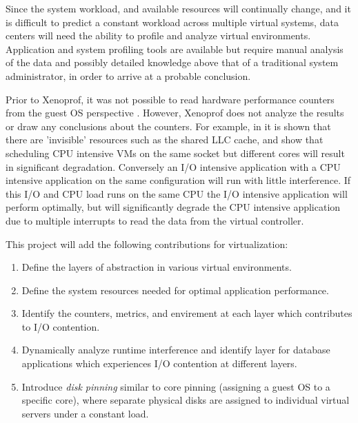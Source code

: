 Since the system workload, and available resources will continually change, and it is difficult to predict a constant workload across multiple virtual systems, data centers will need the ability to profile and analyze virtual environments.  Application and system profiling tools are available but require manual analysis of the data and possibly detailed knowledge above that of a traditional system administrator, in order to arrive at a probable conclusion.   

\indent Prior to Xenoprof, it was not possible to read hardware performance counters from the guest OS perspective \cite{menon, du2}.  However, Xenoprof does not analyze the results or draw any conclusions about the counters.  For example, in \cite{tickoo} it is shown that there are 'invisible' resources such as the shared LLC cache, and show that scheduling CPU intensive VMs on the same socket but different cores will result in significant degradation.  Conversely an I/O intensive application with a CPU intensive application on the same configuration will run with little interference.  If this I/O and CPU load runs on the same CPU the I/O intensive application will perform optimally, but will significantly degrade the CPU intensive application due to multiple interrupts to read the data from the virtual controller.

\indent This project will add the following contributions for virtualization:
\begin{enumerate}
\item Define the layers of abstraction in various virtual environments.
\item Define the system resources needed for optimal application performance.
\item Identify the counters, metrics, and envirement at each layer which contributes to I/O contention.
\item Dynamically analyze runtime interference and identify layer for database applications which experiences I/O contention at different layers.
\item Introduce \emph{disk pinning} similar to core pinning (assigning a guest OS to a specific core), where separate physical disks are assigned to individual virtual servers under a constant load.  
\end{enumerate}

